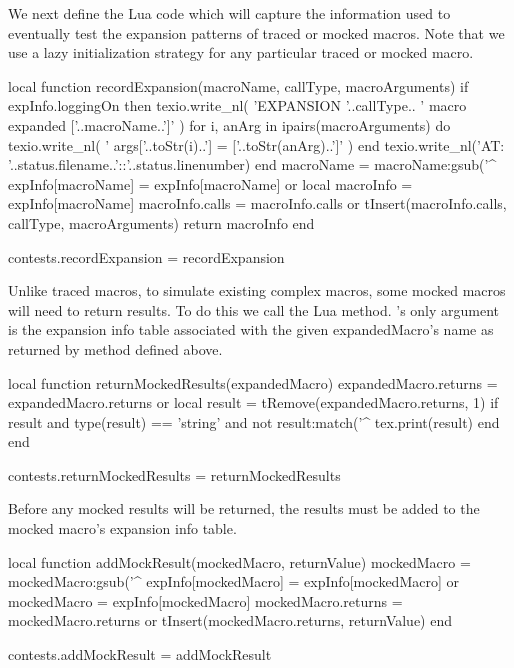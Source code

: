 We next define the Lua code which will capture the information used to 
eventually test the expansion patterns of traced or mocked macros. Note 
that we use a lazy initialization strategy for any particular traced or 
mocked macro. 

\startLuaCode
local function recordExpansion(macroName,
                               callType,
                               macroArguments)
  if expInfo.loggingOn then
    texio.write_nl(
      'EXPANSION '..callType..
      ' macro expanded ['..macroName..']'
    )
    for i, anArg in ipairs(macroArguments) do
      texio.write_nl(
        '  args['..toStr(i)..'] = ['..toStr(anArg)..']'
      )
    end
    texio.write_nl('AT: '..status.filename..'::'..status.linenumber)
  end
  macroName = macroName:gsub('^%
  expInfo[macroName] = expInfo[macroName] or { }
  local macroInfo    = expInfo[macroName]
  macroInfo.calls    = macroInfo.calls or { }
  tInsert(macroInfo.calls, { callType, macroArguments})
  return macroInfo
end

contests.recordExpansion = recordExpansion
\stopLuaCode

Unlike traced macros, to simulate existing complex macros, some mocked 
macros will need to return  results. To do this we call the 
 Lua method. 's only 
argument is the expansion info table associated with the given 
expandedMacro's name as returned by  method defined 
above. 

\startLuaCode
local function returnMockedResults(expandedMacro)
  expandedMacro.returns = expandedMacro.returns or { }
  local result = tRemove(expandedMacro.returns, 1)
  if result and 
     type(result) == 'string' and
     not result:match('^%
    tex.print(result)
  end
end

contests.returnMockedResults = returnMockedResults
\stopLuaCode

Before any mocked results will be returned, the  results 
must be added to the mocked macro's expansion info table. 

\startLuaCode
local function addMockResult(mockedMacro, returnValue)
  mockedMacro = mockedMacro:gsub('^%
  expInfo[mockedMacro] = expInfo[mockedMacro] or { }
  mockedMacro          = expInfo[mockedMacro]
  mockedMacro.returns  = mockedMacro.returns or { }
  tInsert(mockedMacro.returns, returnValue)
end

contests.addMockResult = addMockResult
\stopLuaCode

